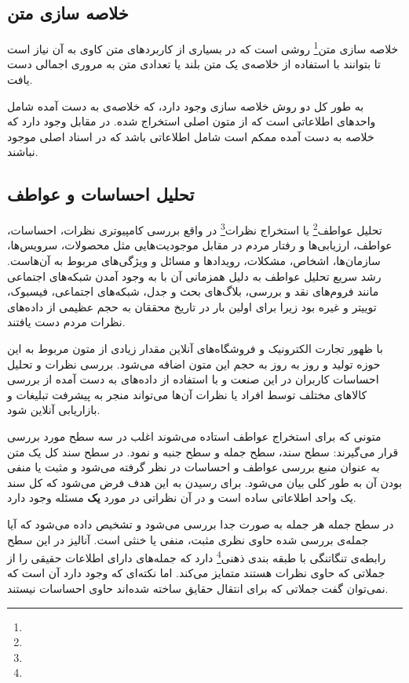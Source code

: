 \documentclass[12pt, a4paper, oneside]{report}
\begin{document}
\subsection{خلاصه سازی متن}

خلاصه سازی متن\footnote{}
روشی است که در بسیاری از کاربرد‌های متن کاوی به آن نیاز است تا بتوانند با استفاده از خلاصه‌ی یک متن بلند
یا تعدادی متن به مروری اجمالی دست یافت.

به طور کل دو روش خلاصه سازی وجود دارد،
که خلاصه‌ی به دست آمده شامل واحد‌های اطلاعاتی است که از متون اصلی استخراج شده. در مقابل
وجود دارد که خلاصه به دست آمده ممکم است شامل اطلاعاتی باشد که در اسناد اصلی موجود نباشند\cite{DBLP:journals/corr/AllahyariPASTGK17a}.

\subsection{تحلیل احساسات و عواطف}

تحلیل عواطف\footnote{}
یا
استخراج نظرات\footnote{}
در واقع بررسی کامپیوتری نظرات، احساسات، عواطف، ارزیابی‌ها و رفتار مردم در مقابل موجودیت‌هایی
مثل محصولات، سرویس‌ها، سازمان‌ها، اشخاص، مشکلات، رویدادها و مسائل و ویژگی‌های مربوط به آن‌هاست.
رشد سریع
تحلیل عواطف
به دلیل همزمانی آن با به وجود آمدن شبکه‌های اجتماعی مانند فروم‌های نقد و بررسی، بلاگ‌های بحث و جدل،
شبکه‌های اجتماعی، فیسبوک، توییتر و غیره بود زیرا برای اولین بار در تاریخ محققان به حجم عظیمی
از داده‌های نظرات مردم دست یافتند.
\cite{zhang2018deep}

با ظهور تجارت الکترونیک و فروشگاه‌های آنلاین مقدار زیادی از متون مربوط به این حوزه تولید و روز به روز
به حجم این متون اضافه می‌شود. بررسی نظرات و تحلیل احساسات کاربران در این صنعت و با استفاده از داده‌های به دست
آمده از بررسی کالاهای مختلف توسط افراد یا نظرات آن‌ها می‌تواند منجر به پیشرفت تبلیغات و بازاریابی آنلاین شود\cite{DBLP:journals/corr/AllahyariPASTGK17a}.

متونی که برای استخراج عواطف استاده می‌شوند اغلب در سه سطح مورد بررسی قرار می‌گیرند: سطح سند، سطح جمله و سطح جنبه و نمود.
در سطح سند کل یک متن به عنوان منبع بررسی عواطف و احساسات در نظر گرفته می‌شود و مثبت یا منفی بودن آن
به طور کلی بیان می‌شود. برای رسیدن به این هدف فرض می‌شود که کل سند یک واحد اطلاعاتی ساده است و در آن
نظراتی در مورد
\textbf{یک}
مسئله وجود دارد.
\cite{zhang2018deep}

در سطح جمله هر جمله به صورت جدا بررسی می‌شود و تشخیص داده می‌شود که آیا جمله‌ی بررسی شده حاوی نظری مثبت، منفی
یا خنثی است. آنالیز در این سطح رابطه‌ی تنگاتنگی با
طبقه بندی ذهنی\footnote{}
دارد که جمله‌های دارای اطلاعات حقیقی را از جملاتی که حاوی نظرات هستند متمایز می‌کند. اما نکته‌ای که وجود دارد آن است که
نمی‌توان گفت جملاتی که برای انتقال حقایق ساخته شده‌اند حاوی احساسات نیستند.
\cite{zhang2018deep}
\end{document}
